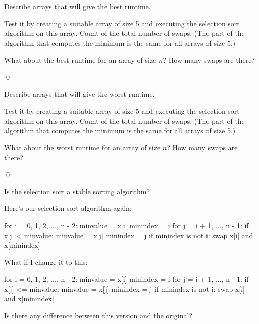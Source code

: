 \newpage
\begin{ex}
\begin{tightlist}
\item Describe arrays that will give the best runtime.
\item Test it by creating a suitable array of size 5 and executing 
the selection sort algorithm on this array.
Count of the total number of swaps.
(The part of the algorithm that computes the minimum is the same
for all arrays of size 5.)
\item What about the best runtime for an array of size $n$?
How many swaps are there?
\end{tightlist}
\qed
\end{ex}

\newpage
\begin{ex}
\begin{tightlist}
\item Describe arrays that will give the worst runtime.
\item Test it by creating a suitable array of size 5 and executing 
the selection sort algorithm on this array.
Count of the total number of swaps.
(The part of the algorithm that computes the minimum is the same
for all arrays of size 5.)
\item What about the worst runtime for an array of size $n$?
How many swaps are there?
\end{tightlist}
\qed
\end{ex}

\newpage
\begin{ex}
\begin{tightlist}
\item Is the selection sort a stable sorting algorithm?
\item Here's our selection sort algorithm again:
\begin{console}
for i = 0, 1, 2, ..., n - 2:
    minvalue = x[i]
    minindex = i
    for j = i + 1, ..., n - 1:
        if x[j] < minvalue:
            minvalue = x[j]
            minindex = j
    if minindex is not i:
        swap x[i] and x[minindex]
\end{console}
What if I change it to this:
\begin{console}
for i = 0, 1, 2, ..., n - 2:
    minvalue = x[i]
    minindex = i
    for j = i + 1, ..., n - 1:
        if x[j] <= minvalue:
            minvalue = x[j]
            minindex = j
    if minindex is not i:
        swap x[i] and x[minindex]
\end{console}
Is there any difference between this version and the original?
\end{tightlist}
\end{ex}

